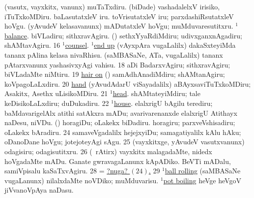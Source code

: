  (vasutx, vayxkitx, \mo vanunx) muTaTxdiru. 
\eanum
\numie
{}  
\banum
{} (biDade) vashadalelxV irisiko, iTuTxkoMDiru. 
 baLasutatxleV iru. 
 toVrisutatxleV iru; parxdashiRsutatxleV hoVgu. 
 (yAvudeV kelasavanunx) mADutatxleV hoVgu; muMduvaresutitxru. 
\eanum
\numie
{}  \hyperref{kandict_b.pdf}{B}{balance(1) nuga(4)}{$^1$balance}. 
\banum
{} biVLadiru; sithxravAgiru. 
 (\rUpa) sethxYyaRdiMdiru; udivxganxnAgadiru; shAMtavAgiru. 
\eanum
\numie
\num{16}  \hyperref{kandict_c.pdf}{C}{counsel(1) nuga(2)}{$^1$counsel}. 
  \hyperref{kandict_e.pdf}{E}{end(1) nuga(15)}{$^1$end up} 
\banum
{} (vAyxpAra \mo vugaLalilx) dakaSxteyiMda tananx pAlina kelasa nivaRhisu. 
 (saMBASaNe, ATa, \mo vugaLalilx) tananx pAtarxvanunx yashasivxyAgi vahisu. 
\eanum
\numie
\num{18}  aDi BadarxvAgiru; sithxravAgiru; biVLadaMte niMtiru. 
\num{19}  \hyperref{kandict_h.pdf}{H}{hair(1) nuga(6)}{hair on} (\ashi) samAdhAnadiMdiru; shAMtanAgiru; koVpagoLaLxdiru. 
\num{20}  \hyperref{kandict_h.pdf}{H}{hand}{hand}  (yAvudAdarU viSayadalilx) aBAyxsaviTuTxkoMDiru; Asakitx, Asethx uLisikoMDiru. 
\num{21}  \hyperref{kandict_h.pdf}{H}{head(1) nuga(21)}{$^1$head}. shAMtateyiMdiru; tale keDisikoLaLxdiru; duDukadiru. 
\num{22}  \hyperref{kandict_h.pdf}{H}{house(1) nuga(6)}{$^1$house}. elalxrigU bAgilu terediru; baMdavarigelAlx atithi satAkxra mADu; avarivarenanxde elalxrigU Atithayx naDesu, niVDu. 
  (\birx) 
\banum
{} horagiDu; oLakekx biDadiru. 
 horagiru; parxveVshisadiru; oLakekx bAradiru. 
\hypertarget{keepnuga24}{} 
\eanum
\numie
\num{24}  samaveVgadalilx hejejxyiDu; samagatiyalilx kAlu hAku; oDanoDane hoVgu; jotejoteyAgi sAgu. 
\num{25}  (vayxkitxge, yAvudeV vasutxvanunx) odagisiru; odagisutitxru. 
\num{26}  (\kanmu\ rAtirx) vayxkitx malagadaMte, nidedx hoVgadaMte mADu. 
  
\banum
{} Ganate gwravagaLanunx kApADiko. 
 BeVTi mADalu, samiVpisalu kaSaTxvAgiru. 
\eanum
\numie
\num{28}  = \hyperlink{keepnuga24}{?nuga? \((24)\).} 
\num{29}  \hyperref{kandict_b.pdf}{B}{ball(1) nuga(5)}{$^1$ball rolling} (saMBASaNe \mo vugaLanunx) nilalxdaMte noVDiko; muMduvarisu. 
  \hyperref{kandict_p.pdf}{P}{pot(1) pagu(3)}{$^1$pot boiling} 
\banum
{} heVge heVgoV jiVvanoVpAya naDasu. 
